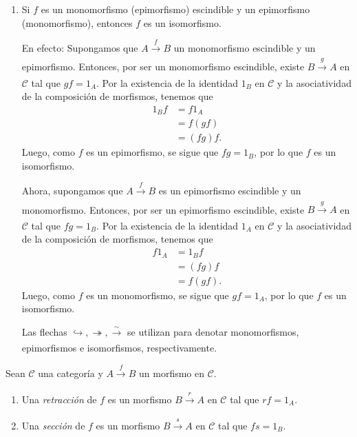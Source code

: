 \documentclass[tesis]{subfiles}
\begin{document}
\begin{Obs}
\begin{enumerate}[label=(\arabic*)]
        \item Si $f$ es un monomorfismo (epimorfismo) escindible y un epimorfismo (monomorfismo), entonces $f$ es un isomorfismo.

            En efecto: Supongamos que $A\xrightarrow[]{f} B$ un monomorfismo escindible y un epimorfismo. Entonces, por ser un monomorfismo escindible, existe $B\xrightarrow[]{g} A$ en $\mathscr{C}$ tal que $gf=1_A$. Por la existencia de la identidad $1_B$ en $\mathscr{C}$ y la asociatividad de la composición de morfismos, tenemos que
            \begin{align*}
                1_Bf &= f1_A \\
                     &= f(gf) \\
                     &= (fg)f.
            \end{align*}
            Luego, como $f$ es un epimorfismo, se sigue que $fg=1_B$, por lo que $f$ es un isomorfismo.

            \noindent Ahora, supongamos que $A\xrightarrow[]{f} B$ es un epimorfismo escindible y un monomorfismo. Entonces, por ser un epimorfismo escindible, existe $B\xrightarrow[]{g} A$ en $\mathscr{C}$ tal que $fg=1_B$. Por la existencia de la identidad $1_A$ en $\mathscr{C}$ y la asociatividad de la composición de morfismos, tenemos que
            \begin{align*}
                f1_A &= 1_Bf \\
                     &= (fg)f \\
                     &= f(gf). 
            \end{align*}
            Luego, como $f$ es un monomorfismo, se sigue que $gf=1_A$, por lo que $f$ es un isomorfismo.

        \noindent Las flechas $\hookrightarrow, \twoheadrightarrow, \xrightarrow[]{\sim}$ se utilizan para denotar monomorfismos, epimorfismos e isomorfismos, respectivamente.
    \end{enumerate}
\end{Obs}

\begin{Def}\label{Def: retracción y seccióñ}
    Sean $\mathscr{C}$ una categoría y $A\xrightarrow[]{f} B$ un morfismo en $\mathscr{C}$.

    \begin{enumerate}[label=(\alph*)]
    
        \item Una \emph{retracción} de $f$ es un morfismo $B\xrightarrow[]{r} A$ en $\mathscr{C}$ tal que $rf=1_A$.

        \item Una \emph{sección} de $f$ es un morfismo $B\xrightarrow[]{s} A$ en $\mathscr{C}$ tal que $fs=1_B$.
    \end{enumerate}
\end{Def}
\end{document}
